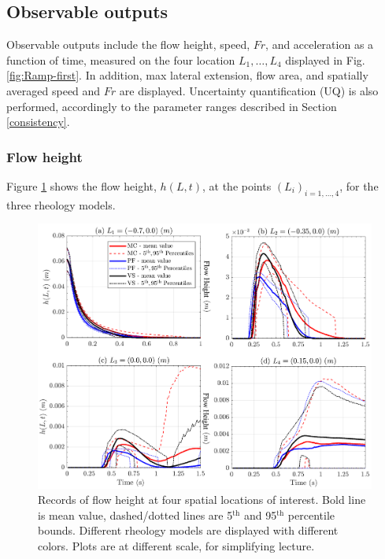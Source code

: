 \documentclass{article}
\begin{document}
\subsection{Observable outputs} \label{Obs1}
Observable outputs include the flow height, speed, $Fr$, and acceleration as a function of time, measured on the four location $L_1,\dots, L_4$ displayed in Fig. \ref{fig:Ramp-first}. In addition, max lateral extension, flow area, and spatially averaged speed and $Fr$ are displayed. Uncertainty quantification (UQ) is also performed, accordingly to the parameter ranges described in Section \ref{consistency}.

\newpage
\subsubsection{Flow height}
Figure \ref{fig:Ramp-H} shows the flow height, $h(L,t)$, at the points $(L_i)_{i=1,\dots,4}$, for the three rheology models.
\begin{figure}[H]
         \centering
        \includegraphics[width=1\textwidth]{InclinedPlane/LocalMeasurments/Height.png}
        \caption{Records of flow height at four spatial locations of interest. Bold line is mean value, dashed/dotted lines are 5$^{\mathrm{th}}$ and 95$^{\mathrm{th}}$ percentile bounds. Different rheology models are displayed with different colors. Plots are at different scale, for simplifying lecture.}
        \label{fig:Ramp-H}
\end{figure}
\end{document}
